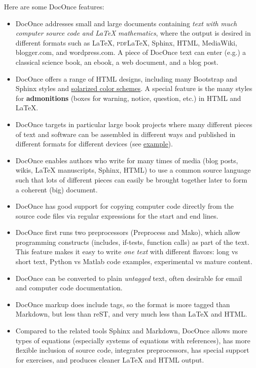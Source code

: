 \documentclass[%
twoside,                 %
final,                   %
10pt]{article}
\newcounter{doconce:movie:counter}
\begin{document}
Here are some DocOnce features:

\begin{itemize}
  \item DocOnce addresses small and large documents containing
    \emph{text with much computer source code and
    {\LaTeX} mathematics}, where the output is desired in different formats
    such as {\LaTeX}, \textsc{pdf}{\LaTeX}, Sphinx, HTML,
    MediaWiki, blogger.com, and wordpress.com.
    A piece of DocOnce text can enter (e.g.) a classical
    science book, an ebook, a web document, and a blog post.

  \item DocOnce offers a range of HTML designs, including many
    Bootstrap and Sphinx styles and \href{{http://ethanschoonover.com/solarized}}{solarized color schemes}.
    A special feature is the many styles for \textbf{admonitions} (boxes for
    warning, notice, question, etc.) in HTML and {\LaTeX}.

  \item DocOnce targets in particular large book projects where many different
    pieces of text and software can be assembled in different ways
    and published in different formats for different devices
    (see \href{{http://hplgit.github.io/setup4book-doconce/doc/web/index.html}}{example}).

  \item DocOnce enables authors who write for many times of media
    (blog posts, wikis, {\LaTeX} manuscripts, Sphinx, HTML) to use a common
    source language such that lots of different pieces can easily be
    brought together later to form a coherent (big) document.

  \item DocOnce has good support for copying computer code
    directly from the source code files via regular expressions
    for the start and end lines.

  \item DocOnce first runs two preprocessors (Preprocess and Mako), which
    allow programming constructs (includes, if-tests, function calls)
    as part of the text. This feature makes it easy to write \emph{one text}
    with different flavors: long vs short text, Python vs Matlab code
    examples, experimental vs mature content.

  \item DocOnce can be converted to plain \emph{untagged} text,
    often desirable for email and computer code documentation.

  \item DocOnce markup does include tags, so the format is more tagged than
    Markdown, but less than reST, and very much less than
    {\LaTeX} and HTML.

  \item Compared to the related tools Sphinx and Markdown, DocOnce
    allows more types of equations (especially systems of
    equations with references), has more flexible
    inclusion of source code, integrates preprocessors, has
    special support for exercises, and produces
    cleaner {\LaTeX} and HTML output.
\end{itemize}
\end{document}
